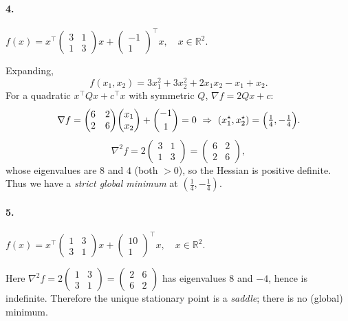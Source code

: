 \documentclass{article}
\begin{document}
\paragraph{4.} $f(x)=x^\top\!\begin{pmatrix}3&1\\[2pt]1&3\end{pmatrix}\!x
+\begin{pmatrix}-1\\[2pt]1\end{pmatrix}^\top\!x,\quad x\in\mathbb{R}^2.$

Expanding,
\[
f(x_1,x_2)=3x_1^2+3x_2^2+2x_1x_2 - x_1 + x_2.
\]
For a quadratic $x^\top Q x + c^\top x$ with symmetric $Q$, $\nabla f = 2Qx+c$:
\[
\nabla f = \begin{pmatrix}6&2\\2&6\end{pmatrix}\!\begin{pmatrix}x_1\\x_2\end{pmatrix}
+\begin{pmatrix}-1\\[2pt]1\end{pmatrix}=0
\ \Rightarrow\ (x_1^\star,x_2^\star)=\Bigl(\tfrac14,-\tfrac14\Bigr).
\]
\[
\nabla^2 f = 2\!\begin{pmatrix}3&1\\1&3\end{pmatrix}
=\begin{pmatrix}6&2\\2&6\end{pmatrix},
\]
whose eigenvalues are $8$ and $4$ (both $>0$), so the Hessian is positive definite. Thus we have a \emph{strict global minimum} at $(\tfrac14,-\tfrac14)$.

\paragraph{5.} $f(x)=x^\top\!\begin{pmatrix}1&3\\[2pt]3&1\end{pmatrix}\!x
+\begin{pmatrix}10\\[2pt]1\end{pmatrix}^\top\!x,\quad x\in\mathbb{R}^2.$

Here $\nabla^2 f=2\!\begin{pmatrix}1&3\\3&1\end{pmatrix}
=\begin{pmatrix}2&6\\6&2\end{pmatrix}$ has eigenvalues $8$ and $-4$, hence is indefinite. Therefore the unique stationary point is a \emph{saddle}; there is no (global) minimum.
\end{document}
